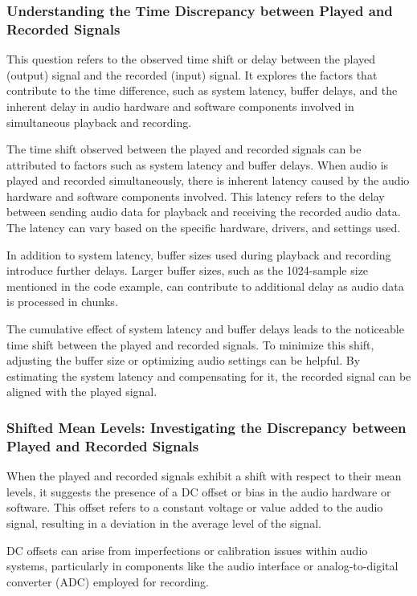 \documentclass[
	a4paper,
	11pt,
]{article}
\begin{document}
\subsubsection{Understanding the Time Discrepancy between Played and Recorded Signals}
This question refers to the observed time shift or delay between the played (output) signal and the recorded (input) signal. It explores the factors that contribute to the time difference, such as system latency, buffer delays, and the inherent delay in audio hardware and software components involved in simultaneous playback and recording.\\
\indent

The time shift observed between the played and recorded signals can be attributed to factors such as system latency and buffer delays. When audio is played and recorded simultaneously, there is inherent latency caused by the audio hardware and software components involved. This latency refers to the delay between sending audio data for playback and receiving the recorded audio data. The latency can vary based on the specific hardware, drivers, and settings used.

In addition to system latency, buffer sizes used during playback and recording introduce further delays. Larger buffer sizes, such as the 1024-sample size mentioned in the code example, can contribute to additional delay as audio data is processed in chunks.

The cumulative effect of system latency and buffer delays leads to the noticeable time shift between the played and recorded signals. To minimize this shift, adjusting the buffer size or optimizing audio settings can be helpful. By estimating the system latency and compensating for it, the recorded signal can be aligned with the played signal.

\indent
\subsubsection{Shifted Mean Levels: Investigating the Discrepancy between Played and Recorded Signals}
When the played and recorded signals exhibit a shift with respect to their mean levels, it suggests the presence of a DC offset or bias in the audio hardware or software. This offset refers to a constant voltage or value added to the audio signal, resulting in a deviation in the average level of the signal.

DC offsets can arise from imperfections or calibration issues within audio systems, particularly in components like the audio interface or analog-to-digital converter (ADC) employed for recording.
\end{document}
